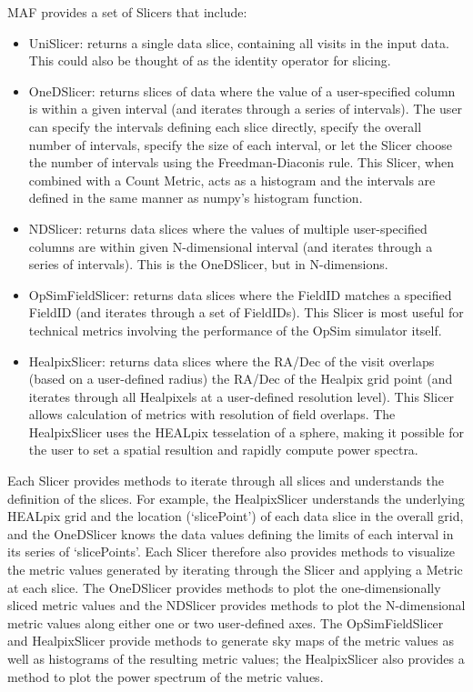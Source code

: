 \documentclass[]{spie}  %
\begin{document}
MAF provides a set of Slicers that include:
\begin{itemize}
\item{UniSlicer: returns a single data slice, containing all visits in
the input data. This could also be thought of as the identity operator
for slicing.}
\item{OneDSlicer: returns slices of data where the value of a
user-specified column is within a given interval (and iterates through
a series of intervals).  The user can specify the intervals defining
each slice directly, specify the overall number of intervals, specify
the size of each interval, or let the Slicer choose the number of
intervals using the Freedman-Diaconis rule. This
Slicer, when combined with a Count Metric, acts as a histogram and the
intervals are defined in the same manner as numpy's histogram
function.}
\item{NDSlicer: returns data slices where the values of multiple
user-specified columns are within given N-dimensional interval (and
iterates through a series of intervals). This is the OneDSlicer, but
in N-dimensions.}
\item{OpSimFieldSlicer: returns data slices where the FieldID
matches a specified FieldID (and iterates through a set of
FieldIDs). This Slicer is most useful for technical metrics involving
the performance of the OpSim simulator itself.}
\item{HealpixSlicer: returns data slices where the RA/Dec of the
visit overlaps (based on a user-defined radius) the RA/Dec of the
Healpix grid point (and iterates through all Healpixels at a
user-defined resolution level). This Slicer allows calculation of
metrics with resolution of field overlaps. The HealpixSlicer uses the 
HEALpix tesselation of a sphere\cite{healpix}, 
making it possible for the 
user to set a spatial resultion and rapidly compute power spectra.}
\end{itemize}
Each Slicer provides methods to iterate through all slices and
understands the definition of the slices. For example, the
HealpixSlicer understands the underlying HEALpix grid and the location (`slicePoint')
of each data slice in the overall grid, and the OneDSlicer knows the
data values defining the limits of each interval in its series of
`slicePoints'.  Each Slicer therefore also
provides methods to visualize the metric values generated by iterating
through the Slicer and applying a Metric at each slice. The OneDSlicer provides methods to plot the
one-dimensionally sliced metric values and the NDSlicer provides methods to plot
the N-dimensional metric values along either one or two user-defined
axes. The OpSimFieldSlicer and HealpixSlicer provide methods to
generate sky maps of the metric values as well as histograms of the
resulting metric values; the HealpixSlicer also provides a method to
plot the power spectrum of the metric values. 
\end{document}
